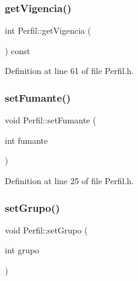 \hypertarget{class_perfil_a75774f6d3b07d76780d638f4e2660e53}{}\label{class_perfil_a75774f6d3b07d76780d638f4e2660e53} 
\subsubsection{\texorpdfstring{get\+Vigencia()}{getVigencia()}}
{\footnotesize\ttfamily int Perfil\+::get\+Vigencia (\begin{DoxyParamCaption}{ }\end{DoxyParamCaption}) const\hspace{0.3cm}{\ttfamily [inline]}}



Definition at line 61 of file Perfil.\+h.

\hypertarget{class_perfil_ad1eda80a3ead2aab4fb6ee4a87420dce}{}\label{class_perfil_ad1eda80a3ead2aab4fb6ee4a87420dce} 
\subsubsection{\texorpdfstring{set\+Fumante()}{setFumante()}}
{\footnotesize\ttfamily void Perfil\+::set\+Fumante (\begin{DoxyParamCaption}\item[{int}]{fumante }\end{DoxyParamCaption})\hspace{0.3cm}{\ttfamily [inline]}}



Definition at line 25 of file Perfil.\+h.

\hypertarget{class_perfil_a171fbb4fd0041f932ce6505ff146325d}{}\label{class_perfil_a171fbb4fd0041f932ce6505ff146325d} 
\subsubsection{\texorpdfstring{set\+Grupo()}{setGrupo()}}
{\footnotesize\ttfamily void Perfil\+::set\+Grupo (\begin{DoxyParamCaption}\item[{int}]{grupo }\end{DoxyParamCaption})\hspace{0.3cm}{\ttfamily [inline]}}




